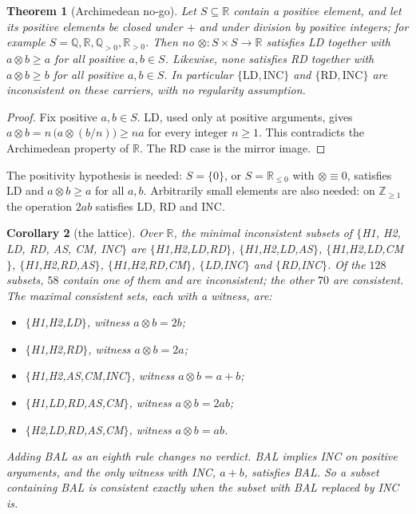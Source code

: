 \documentclass[11pt]{article}
\newtheorem{theorem}{Theorem}
\newtheorem{corollary}[theorem]{Corollary}
\theoremstyle{remark}
\begin{document}
\begin{theorem}[Archimedean no-go]\label{thm:arch}
Let $S\subseteq\mathbb R$ contain a positive element, and let its positive elements be closed under $+$ and under division by positive integers; for example $S=\mathbb Q,\mathbb R,\mathbb Q_{>0},\mathbb R_{>0}$. Then no $\otimes:S\times S\to\mathbb R$ satisfies LD together with $a\otimes b\ge a$ for all positive $a,b\in S$. Likewise, none satisfies RD together with $a\otimes b\ge b$ for all positive $a,b\in S$. In particular $\{\mathrm{LD},\mathrm{INC}\}$ and $\{\mathrm{RD},\mathrm{INC}\}$ are inconsistent on these carriers, with no regularity assumption.
\end{theorem}
\begin{proof}
Fix positive $a,b\in S$. LD, used only at positive arguments, gives $a\otimes b=n\,\bigl(a\otimes(b/n)\bigr)\ge na$ for every integer $n\ge1$. This contradicts the Archimedean property of $\mathbb R$. The RD case is the mirror image.
\end{proof}
The positivity hypothesis is needed: $S=\{0\}$, or $S=\mathbb R_{\le0}$ with $\otimes\equiv0$, satisfies LD and $a\otimes b\ge a$ for all $a,b$. Arbitrarily small elements are also needed: on $\mathbb Z_{\ge1}$ the operation $2ab$ satisfies LD, RD and INC.

\begin{corollary}[the lattice]\label{cor:lattice}
Over $\mathbb R$, the minimal inconsistent subsets of $\{$H1, H2, LD, RD, AS, CM, INC$\}$ are $\{$H1,H2,LD,RD$\}$, $\{$H1,H2,LD,AS$\}$, $\{$H1,H2,LD,CM$\}$, $\{$H1,H2,RD,AS$\}$, $\{$H1,H2,RD,CM$\}$, $\{$LD,INC$\}$ and $\{$RD,INC$\}$. Of the $128$ subsets, $58$ contain one of them and are inconsistent; the other $70$ are consistent. The maximal consistent sets, each with a witness, are:
\begin{itemize}
\item $\{$H1,H2,LD$\}$, witness $a\otimes b=2b$;
\item $\{$H1,H2,RD$\}$, witness $a\otimes b=2a$;
\item $\{$H1,H2,AS,CM,INC$\}$, witness $a\otimes b=a+b$;
\item $\{$H1,LD,RD,AS,CM$\}$, witness $a\otimes b=2ab$;
\item $\{$H2,LD,RD,AS,CM$\}$, witness $a\otimes b=ab$.
\end{itemize}
Adding BAL as an eighth rule changes no verdict. BAL implies INC on positive arguments, and the only witness with INC, $a+b$, satisfies BAL. So a subset containing BAL is consistent exactly when the subset with BAL replaced by INC is.
\end{corollary}
\end{document}
